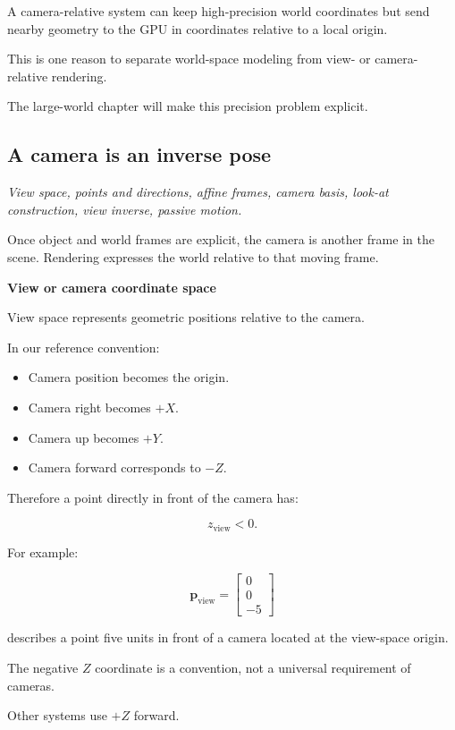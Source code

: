 A camera-relative system can keep high-precision world coordinates but send nearby geometry to the GPU in coordinates relative to a local origin.

This is one reason to separate world-space modeling from view- or camera-relative rendering.

The large-world chapter will make this precision problem explicit.

\subsection{A camera is an inverse pose}\label{02-foundations-ii-ch032-a-camera-is-an-inverse-pose}

\emph{View space, points and directions, affine frames, camera basis, look-at construction, view inverse, passive motion.}

Once object and world frames are explicit, the camera is another frame in the scene. Rendering expresses the world relative to that moving frame.

\textbf{View or camera coordinate space}

View space represents geometric positions relative to the camera.

In our reference convention:

\begin{itemize}
\tightlist
\item
  Camera position becomes the origin.
\item
  Camera right becomes \(+X\).
\item
  Camera up becomes \(+Y\).
\item
  Camera forward corresponds to \(-Z\).
\end{itemize}

Therefore a point directly in front of the camera has:

\[
 z_{\mathrm{view}}<0.
\]

For example:

\[
 \boxed{ \mathbf p_{\mathrm{view}}= \begin{bmatrix}0\\0\\-5\end{bmatrix} }
\]

describes a point five units in front of a camera located at the view-space origin.

The negative \(Z\) coordinate is a convention, not a universal requirement of cameras.

Other systems use \(+Z\) forward.

